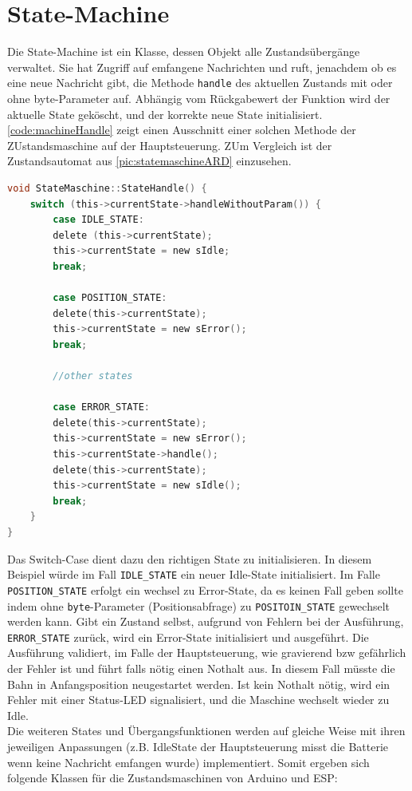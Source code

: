 \section{State-Machine}
Die State-Machine ist ein Klasse, dessen Objekt alle Zustandsübergänge verwaltet. Sie hat Zugriff auf emfangene Nachrichten und ruft, jenachdem ob es eine neue Nachricht gibt, die Methode \texttt{handle} des aktuellen Zustands mit oder ohne byte-Parameter auf. Abhängig vom Rückgabewert der Funktion wird der aktuelle State geköscht, und der korrekte neue State initialisiert. \autoref{code:machineHandle} zeigt einen Ausschnitt einer solchen Methode der ZUstandsmaschine auf der Hauptsteuerung. ZUm Vergleich ist der Zustandsautomat aus \autoref{pic:statemaschineARD} einzusehen.
\vspace{0.5cm}
\begin{lstlisting}[language=c, style=dhpaperdefault]
void StateMaschine::StateHandle() { 
	switch (this->currentState->handleWithoutParam()) {
		case IDLE_STATE:
		delete (this->currentState);
		this->currentState = new sIdle;
		break;

		case POSITION_STATE:
		delete(this->currentState);
		this->currentState = new sError();
		break;

		//other states

		case ERROR_STATE:
		delete(this->currentState);
		this->currentState = new sError();
		this->currentState->handle();
		delete(this->currentState);
		this->currentState = new sIdle();
		break;
	}
}
\end{lstlisting}

Das Switch-Case dient dazu den richtigen State zu initialisieren. In diesem Beispiel würde im Fall \texttt{IDLE\_STATE} ein neuer Idle-State initialisiert. Im Falle \texttt{POSITION\_STATE} erfolgt ein wechsel zu Error-State, da es keinen Fall geben sollte indem ohne \texttt{byte}-Parameter (Positionsabfrage) zu \texttt{POSITOIN\_STATE} gewechselt werden kann. Gibt ein Zustand selbst, aufgrund von Fehlern bei der Ausführung, \texttt{ERROR\_STATE} zurück, wird ein Error-State initialisiert und ausgeführt. Die Ausführung validiert, im Falle der Hauptsteuerung, wie gravierend bzw gefährlich der Fehler ist und führt falls nötig einen Nothalt aus. In diesem Fall müsste die Bahn in Anfangsposition neugestartet werden. Ist kein Nothalt nötig, wird ein Fehler mit einer Status-LED signalisiert, und die Maschine wechselt wieder zu Idle. 
\\ Die weiteren States und Übergangsfunktionen werden auf gleiche Weise mit ihren jeweiligen Anpassungen (z.B. IdleState der Hauptsteuerung misst die Batterie wenn keine Nachricht emfangen wurde) implementiert. Somit ergeben sich folgende Klassen für die Zustandsmaschinen von Arduino und ESP:


